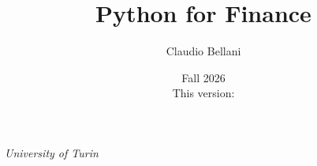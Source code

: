 \title{Python for Finance} %
\author%
{%
	{Claudio Bellani}
}
\institute%
{%
	\textit{University of Turin}
}
\date[Fall 2026]{Fall 2026\\[1ex] This version: \compilationDate}
